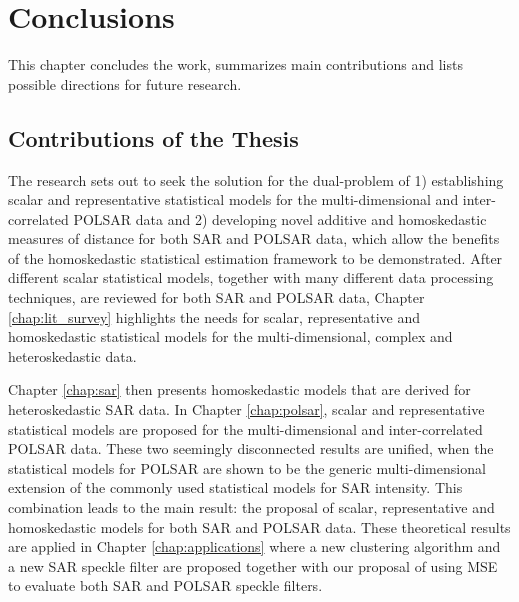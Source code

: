 \chapter{Conclusions} %
\label{chap:conclusions}



This chapter concludes the work, summarizes main contributions and lists possible directions for future research.


\section{Contributions of the Thesis}
\label{sec:conclusion_contribution}

The research sets out to seek the solution for the dual-problem of 
1) establishing scalar and representative statistical models for the multi-dimensional and inter-correlated POLSAR data 
and 
2) developing novel additive and homoskedastic measures of distance for both SAR and POLSAR data, which allow the benefits of the homoskedastic statistical estimation framework to be demonstrated. 
After different scalar statistical models, together with many different data processing techniques, are reviewed for both SAR and POLSAR data,
  Chapter \ref{chap:lit_survey} highlights the needs for scalar, representative and homoskedastic statistical models for the multi-dimensional, complex and heteroskedastic data.

 Chapter \ref{chap:sar} then presents homoskedastic models that are derived for heteroskedastic SAR data. 
In Chapter \ref{chap:polsar}, scalar and representative statistical models are proposed for the multi-dimensional and inter-correlated POLSAR data.
These two seemingly disconnected results are unified, when the statistical models for POLSAR are shown to be the generic multi-dimensional extension of the commonly used statistical models for SAR intensity.
This combination leads to the main result: the proposal of scalar, representative and homoskedastic models for both SAR and POLSAR data.
These theoretical results are applied in Chapter \ref{chap:applications} where a new clustering algorithm and a new SAR speckle filter are proposed together with our proposal of using MSE to evaluate both SAR and POLSAR speckle filters.

